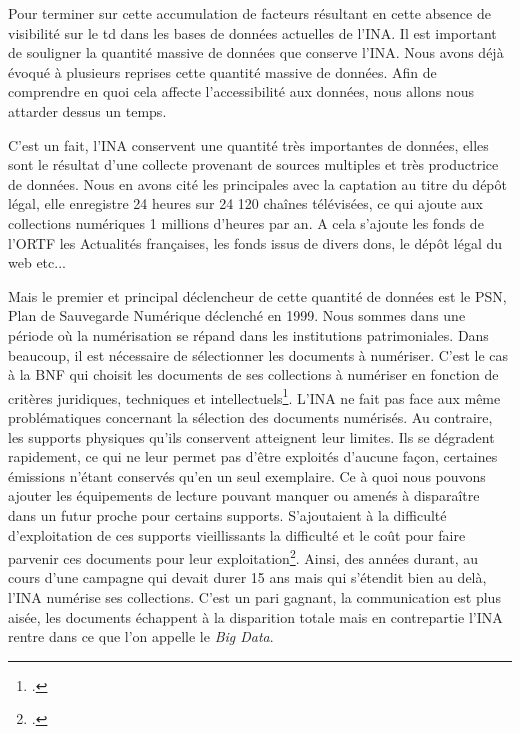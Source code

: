 
Pour terminer sur cette accumulation de facteurs résultant en cette absence de visibilité sur le \gls{td} dans les bases de données actuelles de l'INA. Il est important de souligner la quantité massive de données que conserve l'INA. Nous avons déjà évoqué à plusieurs reprises cette quantité massive de données. Afin de comprendre en quoi cela affecte l'accessibilité aux données, nous allons nous attarder dessus un temps. 


C'est un fait, l'INA conservent une quantité très importantes de données, elles sont le résultat d'une collecte provenant de sources multiples et très productrice de données. Nous en avons cité les principales avec la captation au titre du dépôt légal, elle enregistre 24 heures sur 24 120 chaînes télévisées, ce qui ajoute aux collections numériques 1 millions d'heures par an.  A cela s'ajoute les fonds de l'ORTF les Actualités françaises, les fonds issus de divers dons, le dépôt légal du web etc... 


Mais le premier et principal déclencheur de cette quantité de données est le PSN, Plan de Sauvegarde Numérique déclenché en 1999. Nous sommes dans une période où la numérisation se répand dans les institutions patrimoniales. Dans beaucoup, il est nécessaire de sélectionner les documents à numériser. C'est le cas à la BNF qui choisit les documents de ses collections à numériser en fonction de critères juridiques, techniques et intellectuels\footcite[][155]{bermès2024}. L'INA ne fait pas face aux même problématiques concernant la sélection des documents numérisés. Au contraire, les supports physiques qu'ils conservent atteignent leur limites. Ils se dégradent rapidement, ce qui ne leur permet pas d'être exploités d'aucune façon, certaines émissions n'étant conservés qu'en un seul exemplaire. Ce à quoi nous pouvons ajouter les équipements de lecture pouvant manquer ou amenés à disparaître dans un futur proche pour certains supports. S'ajoutaient à la difficulté d'exploitation de ces supports vieillissants la difficulté et le coût pour faire parvenir ces documents pour leur exploitation\footcite[28]{varra2023}. Ainsi, des années durant, au cours d'une campagne qui devait durer 15 ans mais qui s'étendit bien au delà, l'INA numérise ses collections. C'est un pari gagnant, la communication est plus aisée, les documents échappent à la disparition totale mais en contrepartie l'INA rentre dans ce que l'on appelle le \textit{Big Data}. 

